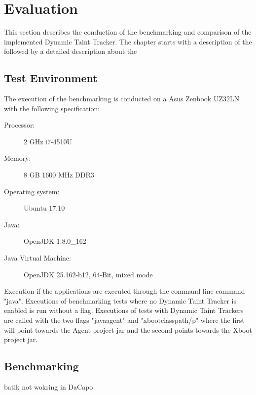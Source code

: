 \chapter{Evaluation}
This section describes the conduction of the benchmarking and comparison of the implemented Dynamic Taint Tracker. The chapter starts with a description of the \textit{} followed by a detailed description about the \textit{}

\section{Test Environment}
\label{TestEnvironment}
The execution of the benchmarking is conducted on a Asus Zenbook UZ32LN with the following specification:

\hfill
\begin{description}
	\item [Processor:] 2 GHz i7-4510U
	\item [Memory:] 8 GB 1600 MHz DDR3
	\item [Operating system:] Ubuntu 17.10
	\item [Java:] OpenJDK 1.8.0\_162
	\item [Java Virtual Machine:] OpenJDK 25.162-b12, 64-Bit, mixed mode
\end{description}
\hfill

Execution if the applications are executed through the command line command "java". Executions of benchmarking tests where no Dynamic Taint Tracker is enabled is run without a flag. Executions of tests with Dynamic Taint Trackers are called with the two flags "javaagent" and "xbootclasspath/p" where the first will point towards the Agent project jar and the second points towards the Xboot project jar.


\section{Benchmarking}
\label{Benchmarking}


batik not wokring in DaCapo